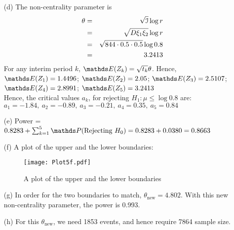 \documentclass[11pt,a4paper]{article}
\begin{document}
\begin{enumerate}
\begin{enumerate}
\item[(d)] The non-centrality parameter is
\begin{eqnarray*}
 \theta & = & \sqrt{\mathcal{I}}\log r \\
        & = & \sqrt{D \xi_1 \xi_2} \log r \\
        & = & \sqrt{844 \cdot 0.5 \cdot 0.5 } \log 0.8 \\
        & = & 3.2413
\end{eqnarray*}
For any interim period $k$, $\Exp(Z_k) = \sqrt{t_k}\theta$. Hence,\\
$\Exp(Z_1) = 1.4496$; 
$\Exp(Z_2) = 2.05$; 
$\Exp(Z_3) = 2.5107$; 
$\Exp(Z_4) = 2.8991$; 
$\Exp(Z_5) = 3.2413$ \\
Hence, the critical values $a_k$, for rejecting $H_1: \mu \leq \log 0.8$ are:\\
$a_1 = -1.84,\ a_2 = -0.89,\ a_3 = -0.21,\ a_4 = 0.35,\ a_5 = 0.84$

\item[(e)] Power = $0.8283 + \sum_{k = 1}^5 \Prob(\text{Rejecting } H_0) = 0.8283 + 0.0380 = 0.8663$

\item[(f)] A plot of the upper and the lower boundaries:
\begin{figure}[H]
\begin{center}
\texttt{[image: Plot5f.pdf]}
\end{center}
\caption{A plot of the upper and the lower boundaries}
\end{figure}

\item[(g)] In order for the two boundaries to match, $\theta_{\text{new}} = 4.802$. With this new non-centrality parameter, the power is 0.993.
\item[(h)] For this $\theta_{\text{new}}$, we need 1853 events, and hence require 7864 sample size.

\end{enumerate}


\end{enumerate}
\end{document}
